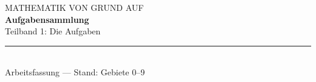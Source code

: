 \documentclass[11pt,a4paper,twoside]{book}
\begin{document}
\thispagestyle{empty}
\vspace*{30mm}
{\sffamily\small\color{grau}MATHEMATIK VON GRUND AUF}\\[8pt]
{\Huge\bfseries\color{tief}Aufgabensammlung}\\[10pt]
{\Large\color{grau}Teilband 1: Die Aufgaben}\\[22pt]
{\color{linie}\rule{\textwidth}{0.6pt}}\\[14pt]
{\small\color{grau}Arbeitsfassung --- Stand: Gebiete 0--9}
\cleardoublepage
\tableofcontents
\cleardoublepage

\cleardoublepage

\cleardoublepage

\cleardoublepage

\cleardoublepage

\cleardoublepage

\cleardoublepage

\cleardoublepage

\cleardoublepage

\cleardoublepage

\cleardoublepage

\end{document}
